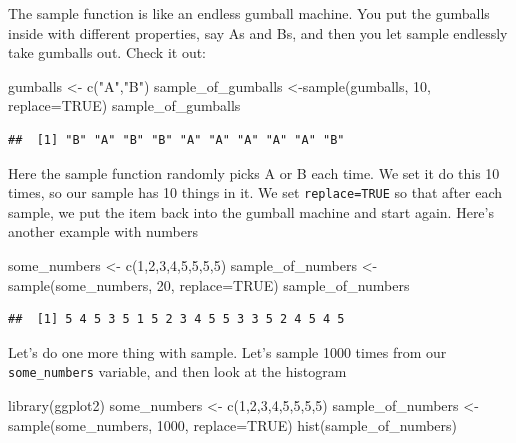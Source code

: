 \documentclass[
]{book}
\newenvironment{Shaded}{\begin{snugshade}}{\end{snugshade}}
\newcommand{\AttributeTok}[1]{\textcolor[rgb]{0.77,0.63,0.00}{#1}}
\newcommand{\ConstantTok}[1]{\textcolor[rgb]{0.00,0.00,0.00}{#1}}
\newcommand{\DecValTok}[1]{\textcolor[rgb]{0.00,0.00,0.81}{#1}}
\newcommand{\FunctionTok}[1]{\textcolor[rgb]{0.00,0.00,0.00}{#1}}
\newcommand{\NormalTok}[1]{#1}
\newcommand{\OtherTok}[1]{\textcolor[rgb]{0.56,0.35,0.01}{#1}}
\newcommand{\StringTok}[1]{\textcolor[rgb]{0.31,0.60,0.02}{#1}}
\begin{document}
The sample function is like an endless gumball machine. You put the gumballs inside with different properties, say As and Bs, and then you let sample endlessly take gumballs out. Check it out:

\begin{Shaded}
\begin{Highlighting}[]
\NormalTok{gumballs }\OtherTok{\textless{}{-}} \FunctionTok{c}\NormalTok{(}\StringTok{"A"}\NormalTok{,}\StringTok{"B"}\NormalTok{)}
\NormalTok{sample\_of\_gumballs }\OtherTok{\textless{}{-}}\FunctionTok{sample}\NormalTok{(gumballs, }\DecValTok{10}\NormalTok{, }\AttributeTok{replace=}\ConstantTok{TRUE}\NormalTok{)}
\NormalTok{sample\_of\_gumballs}
\end{Highlighting}
\end{Shaded}

\begin{verbatim}
##  [1] "B" "A" "B" "B" "A" "A" "A" "A" "A" "B"
\end{verbatim}

Here the sample function randomly picks A or B each time. We set it do this 10 times, so our sample has 10 things in it. We set \texttt{replace=TRUE} so that after each sample, we put the item back into the gumball machine and start again. Here's another example with numbers

\begin{Shaded}
\begin{Highlighting}[]
\NormalTok{some\_numbers }\OtherTok{\textless{}{-}} \FunctionTok{c}\NormalTok{(}\DecValTok{1}\NormalTok{,}\DecValTok{2}\NormalTok{,}\DecValTok{3}\NormalTok{,}\DecValTok{4}\NormalTok{,}\DecValTok{5}\NormalTok{,}\DecValTok{5}\NormalTok{,}\DecValTok{5}\NormalTok{,}\DecValTok{5}\NormalTok{)}
\NormalTok{sample\_of\_numbers }\OtherTok{\textless{}{-}}\FunctionTok{sample}\NormalTok{(some\_numbers, }\DecValTok{20}\NormalTok{, }\AttributeTok{replace=}\ConstantTok{TRUE}\NormalTok{)}
\NormalTok{sample\_of\_numbers}
\end{Highlighting}
\end{Shaded}

\begin{verbatim}
##  [1] 5 4 5 3 5 1 5 2 3 4 5 5 3 3 5 2 4 5 4 5
\end{verbatim}

Let's do one more thing with sample. Let's sample 1000 times from our \texttt{some\_numbers} variable, and then look at the histogram

\begin{Shaded}
\begin{Highlighting}[]
\FunctionTok{library}\NormalTok{(ggplot2)}
\NormalTok{some\_numbers }\OtherTok{\textless{}{-}} \FunctionTok{c}\NormalTok{(}\DecValTok{1}\NormalTok{,}\DecValTok{2}\NormalTok{,}\DecValTok{3}\NormalTok{,}\DecValTok{4}\NormalTok{,}\DecValTok{5}\NormalTok{,}\DecValTok{5}\NormalTok{,}\DecValTok{5}\NormalTok{,}\DecValTok{5}\NormalTok{)}
\NormalTok{sample\_of\_numbers }\OtherTok{\textless{}{-}}\FunctionTok{sample}\NormalTok{(some\_numbers, }\DecValTok{1000}\NormalTok{, }\AttributeTok{replace=}\ConstantTok{TRUE}\NormalTok{)}
\FunctionTok{hist}\NormalTok{(sample\_of\_numbers)}
\end{Highlighting}
\end{Shaded}
\end{document}
